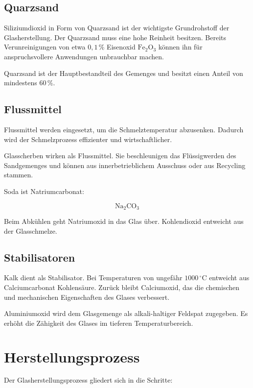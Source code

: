\documentclass[
  12pt,
  a4paper,
  oneside
]{scrreprt}
\begin{document}
\subsection{Quarzsand}

Siliziumdioxid in Form von Quarzsand ist der wichtigste Grundrohstoff
der Glasherstellung. Der Quarzsand muss eine hohe Reinheit besitzen.
Bereits Verunreinigungen von etwa $0{,}1\,\%$ Eisenoxid
$\mathrm{Fe_2O_3}$ können ihn für anspruchsvollere Anwendungen
unbrauchbar machen. 

Quarzsand ist der Hauptbestandteil des Gemenges und besitzt einen
Anteil von mindestens $60\,\%$. 

\subsection{Flussmittel}

Flussmittel werden eingesetzt, um die Schmelztemperatur abzusenken.
Dadurch wird der Schmelzprozess effizienter und wirtschaftlicher.


Glasscherben wirken als Flussmittel. Sie beschleunigen das
Flüssigwerden des Sandgemenges und können aus innerbetrieblichem
Ausschuss oder aus Recycling stammen. 

Soda ist Natriumcarbonat:

\begin{equation}
  \mathrm{Na_2CO_3}
\end{equation}

Beim Abkühlen geht Natriumoxid in das Glas über. Kohlendioxid entweicht
aus der Glasschmelze. 

\subsection{Stabilisatoren}

Kalk dient als Stabilisator. Bei Temperaturen von ungefähr
$1000\,^\circ\mathrm{C}$ entweicht aus Calciumcarbonat Kohlensäure.
Zurück bleibt Calciumoxid, das die chemischen und mechanischen
Eigenschaften des Glases verbessert. 

Aluminiumoxid wird dem Glasgemenge als alkali-haltiger Feldspat
zugegeben. Es erhöht die Zähigkeit des Glases im tieferen
Temperaturbereich. 

\section{Herstellungsprozess}

Der Glasherstellungsprozess gliedert sich in die Schritte:
\end{document}
